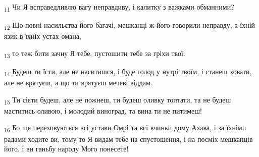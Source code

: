 \begin{tcolorbox}
\textsubscript{11} Чи Я всправедливлю вагу неправдиву, і калитку з важками обманними?
\end{tcolorbox}
\begin{tcolorbox}
\textsubscript{12} Що повні насильства його багачі, мешканці ж його говорили неправду, а їхній язик в їхніх устах омана,
\end{tcolorbox}
\begin{tcolorbox}
\textsubscript{13} то теж бити зачну Я тебе, пустошити тебе за гріхи твої.
\end{tcolorbox}
\begin{tcolorbox}
\textsubscript{14} Будеш ти їсти, але не наситишся, і буде голод у нутрі твоїм, і станеш ховати, але не врятуєш, а що ти врятуєш мечеві віддам.
\end{tcolorbox}
\begin{tcolorbox}
\textsubscript{15} Ти сіяти будеш, але не пожнеш, ти будеш оливку топтати, та не будеш маститись оливою, і молодий виноград, та вина ти не питимеш!
\end{tcolorbox}
\begin{tcolorbox}
\textsubscript{16} Бо ще переховуються всі устави Омрі та всі вчинки дому Ахава, і за їхніми радами ходите ви, тому то Я видам тебе на спустошення, і на посміх мешканців його, і ви ганьбу народу Мого понесете!
\end{tcolorbox}

